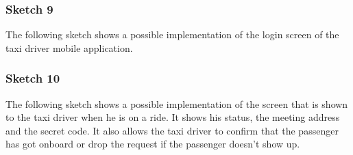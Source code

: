 \subsubsection*{Sketch 9}
The following sketch shows a possible implementation of the login screen of the taxi driver mobile application.
\begin{figure}[H]
\centering
{}
\end{figure}


\subsubsection*{Sketch 10}
The following sketch shows a possible implementation of the screen that is shown to the taxi driver when he is on a ride. It shows his status, the meeting address and the secret code. It also allows the taxi driver to confirm that the passenger has got onboard or drop the request if the passenger doesn't show up.
\begin{figure}[H]
\centering
{}
\end{figure}


